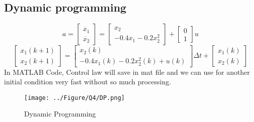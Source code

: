\subsection{Dynamic programming}
$$
a = \begin{bmatrix}
	\dot{x_1}\\
	\dot{x_2}
\end{bmatrix} = \begin{bmatrix}
	x_2\\
	-0.4x_1 -0.2x_2^2
\end{bmatrix} + \begin{bmatrix}
	0\\
	1
\end{bmatrix}u
$$
$$
\begin{bmatrix}
	x_1(k+1)\\
	x_2(k+1)
\end{bmatrix} = \begin{bmatrix}
	x_2(k)\\
	-0.4x_1(k) -0.2x_2^2(k) + u(k)
\end{bmatrix} \Delta t + \begin{bmatrix}
	x_1(k)\\
	x_2(k)
\end{bmatrix}
$$
In MATLAB Code, Control law will save in mat file and we can use for another initial condition very fast without so much processing.
\begin{figure}[H]
	\caption{Dynamic Programming}
	\centering
	\texttt{[image: ../Figure/Q4/DP.png]}
\end{figure}